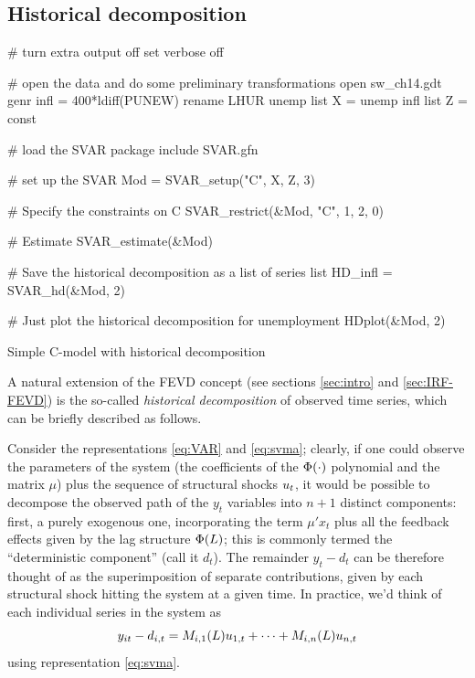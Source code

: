\documentclass[a4paper,10pt]{article}
\newcommand{\StS}[1]{\ensuremath u_{#1}}
\newcommand{\VarSym}{\ensuremath \Phi}
\begin{document}
\subsection{Historical decomposition}
\label{sec:HD}

\begin{table}[htbp]
\begin{scode}
# turn extra output off
set verbose off

# open the data and do some preliminary transformations
open sw_ch14.gdt
genr infl = 400*ldiff(PUNEW)
rename LHUR unemp
list X = unemp infl
list Z = const

# load the SVAR package
include SVAR.gfn

# set up the SVAR
Mod = SVAR_setup("C", X, Z, 3)

# Specify the constraints on C
SVAR_restrict(&Mod, "C", 1, 2, 0)

# Estimate
SVAR_estimate(&Mod)

# Save the historical decomposition as a list of series
list HD_infl = SVAR_hd(&Mod, 2)

# Just plot the historical decomposition for unemployment
HDplot(&Mod, 2)
\end{scode}
  \caption{Simple C-model with historical decomposition}
  \label{tab:simpleC-hd}
\end{table}

A natural extension of the FEVD concept (see
sections \ref{sec:intro} and \ref{sec:IRF-FEVD}) is the so-called
\emph{historical decomposition} of observed time series, which can be
briefly described as follows.

Consider the representations \eqref{eq:VAR} and \eqref{eq:svma};
clearly, if one could observe the parameters of the system (the
coefficients of the $\VarSym(\cdot)$ polynomial and the matrix $\mu$) plus
the sequence of structural shocks $\StS{t}$, it would be possible to
decompose the observed path of the $y_t$ variables into $n + 1$
distinct components: first, a purely exogenous one, incorporating the
term $\mu' x_t$ plus all the feedback effects given by the lag
structure $\VarSym(L)$; this is commonly termed the ``deterministic
component'' (call it $d_t$). The remainder $y_t - d_t$ can be
therefore thought of as the superimposition of separate contributions,
given by each structural shock hitting the system at a given time. In
practice, we'd think of each individual series in the system as
\[
 y_{it} - d_{i,t} = M_{i,1}(L) \StS{1,t} + \cdots + M_{i,n}(L) \StS{n,t} 
\]
using representation \eqref{eq:svma}. 
\end{document}
